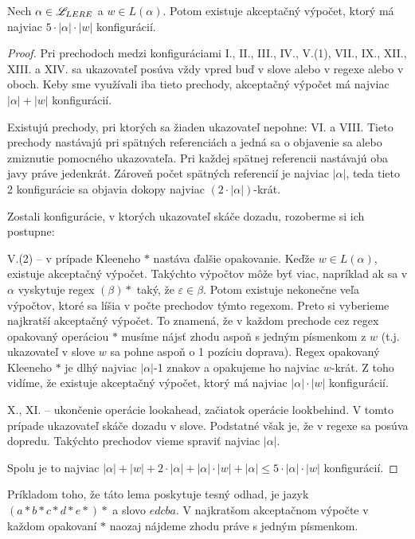 \begin{lema}\label{dlzka_vypoctu_rw}
Nech $\alpha \in \mathscr{L}_{LERE}$ a $w \in L(\alpha)$. Potom existuje akceptačný výpočet, ktorý má najviac $5\cdot|\alpha|\cdot|w|$ konfigurácií.
\end{lema}
\begin{proof}
Pri prechodoch medzi konfiguráciami I., II., III., IV., V.(1), VII., IX., XII., XIII. a XIV. sa ukazovateľ posúva vždy vpred buď v slove alebo v regexe alebo v oboch. Keby sme využívali iba tieto prechody, akceptačný výpočet má najviac $\left\vert{\alpha}\right\vert+|w|$ konfigurácií.

Existujú prechody, pri ktorých sa žiaden ukazovateľ nepohne: VI. a VIII. Tieto prechody nastávajú pri spätných referenciách a jedná sa o objavenie sa alebo zmiznutie pomocného ukazovateľa. Pri každej spätnej referencii nastávajú oba javy práve jedenkrát. Zároveň počet spätných referencií je najviac $|\alpha|$, teda tieto 2 konfigurácie sa objavia dokopy najviac $(2\cdot\left\vert{\alpha}\right\vert)$-krát.

Zostali konfigurácie, v ktorých ukazovateľ skáče dozadu, rozoberme si ich postupne:

V.(2) -- v prípade Kleeneho $*$ nastáva ďalšie opakovanie. Keďže $w\in L(\alpha)$, existuje akceptačný výpočet. Takýchto výpočtov môže byť viac, napríklad ak sa v $\alpha$ vyskytuje regex $(\beta)*$ taký, že $\varepsilon \in \beta$. Potom existuje nekonečne veľa výpočtov, ktoré sa líšia v počte prechodov týmto regexom. Preto si vyberieme najkratší akceptačný výpočet. To znamená, že v každom prechode cez regex opakovaný operáciou $*$ musíme nájsť zhodu aspoň s jedným písmenkom z $w$ (t.j. ukazovateľ v slove $w$ sa pohne aspoň o 1 pozíciu doprava). Regex opakovaný Kleeneho $*$ je dlhý najviac $|\alpha|$-1 znakov a opakujeme ho najviac $w$-krát. Z toho vidíme, že existuje akceptačný výpočet, ktorý má najviac $|\alpha|\cdot|w|$ konfigurácií.

X., XI. -- ukončenie operácie lookahead, začiatok operácie lookbehind. V tomto prípade ukazovateľ skáče dozadu v slove. Podstatné však je, že v regexe sa posúva dopredu. Takýchto prechodov vieme spraviť najviac $|\alpha|$.

Spolu je to najviac $|\alpha|+|w|+2\cdot|\alpha|+|\alpha|\cdot|w|+|\alpha| \leq 5\cdot|\alpha|\cdot|w|$ konfigurácií.

\end{proof}

Príkladom toho, že táto lema poskytuje tesný odhad, je jazyk $(a*b*c*d*e*)*$ a slovo $edcba$. V najkratšom akceptačnom výpočte v každom opakovaní $*$ naozaj nájdeme zhodu práve s jedným písmenkom.

